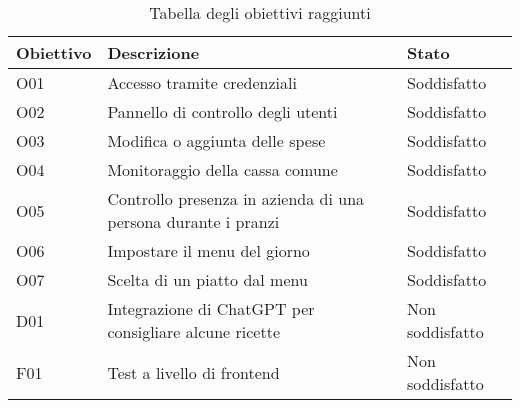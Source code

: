 \begin{table}[htb]%
    \caption{Tabella degli obiettivi raggiunti}
    \label{tab:obiettivi-raggiunti}
    \begin{tabularx}{\textwidth}{lXl}
    \hline
    \textbf{Obiettivo} & \textbf{Descrizione} & \textbf{Stato}\\
    \hline\hline
    O01     & Accesso tramite credenziali & Soddisfatto \\
    \hline
    O02     & Pannello di controllo degli utenti & Soddisfatto \\
    \hline
    O03     & Modifica o aggiunta delle spese & Soddisfatto \\
    \hline
    O04     & Monitoraggio della cassa comune & Soddisfatto \\
    \hline
    O05     & Controllo presenza in azienda di una persona durante i pranzi & Soddisfatto \\
    \hline
    O06     & Impostare il menu del giorno & Soddisfatto \\
    \hline
    O07     & Scelta di un piatto dal menu & Soddisfatto \\
    \hline
    D01     & Integrazione di ChatGPT per consigliare alcune ricette & Non soddisfatto \\
    \hline
    F01     & Test a livello di frontend & Non soddisfatto \\
    \hline
    \end{tabularx}
\end{table}%

\newpage


